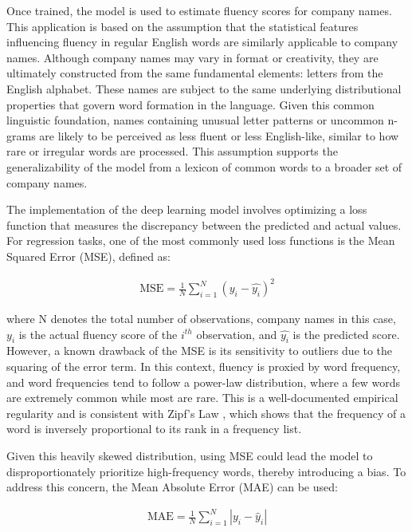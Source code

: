 \documentclass[a4paper,11pt]{report}
\begin{document}
Once trained, the model is used to estimate fluency scores for company names. This application is based on the assumption that the statistical features influencing fluency in regular English words are similarly applicable to company names. Although company names may vary in format or creativity, they are ultimately constructed from the same fundamental elements: letters from the English alphabet. These names are subject to the same underlying distributional properties that govern word formation in the language. Given this common linguistic foundation, names containing unusual letter patterns or uncommon n-grams are likely to be perceived as less fluent or less English-like, similar to how rare or irregular words are processed. This assumption supports the generalizability of the model from a lexicon of common words to a broader set of company names.

The implementation of the deep learning model involves optimizing a loss function that measures the discrepancy between the predicted and actual values. For regression tasks, one of the most commonly used loss functions is the Mean Squared Error (MSE), defined as:

\begin{align}
    \text{MSE} = \frac{1}{N} \sum_{i=1}^N (y_i - \hat{y_i})^2
\end{align}

\noindent where N denotes the total number of observations, company names in this case, $y_i$ is the actual fluency score of the $i^{th}$ observation, and $\hat{y_i}$ is the predicted score. However, a known drawback of the MSE is its sensitivity to outliers due to the squaring of the error term. In this context, fluency is proxied by word frequency, and word frequencies tend to follow a power-law distribution, where a few words are extremely common while most are rare. This is a well-documented empirical regularity and is consistent with Zipf’s Law \cite{zipf}, which shows that the frequency of a word is inversely proportional to its rank in a frequency list.

Given this heavily skewed distribution, using MSE could lead the model to disproportionately prioritize high-frequency words, thereby introducing a bias. To address this concern, the Mean Absolute Error (MAE) can be used:

\begin{align}
    \text{MAE} = \frac{1}{N} \sum_{i=1}^N \left| y_i - \hat{y}_i \right|
\end{align}
\end{document}
